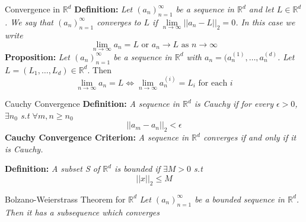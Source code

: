 \documentclass{article}
\begin{document}
\begin{multicols*}{3}
\begin{blackbox}{Convergence in $\mathbb{R}^d$}
\textbf{Definition:}\textit{ Let $(a_n)_{n=1}^\infty$ be a sequence in $\mathbb{R}^d$ and let $L \in \mathbb{R}^d$. We say that $(a_n)_{n=1}^\infty$ converges to $L$ if $\lim\limits_{n\rightarrow\infty} ||a_n - L||_2 = 0$. In this case we write}\\[-3ex]
\[\lim_{n\rightarrow \infty} a_n = L \text{ or } a_n \rightarrow L \text{ as } n \rightarrow \infty\]
\textbf{Proposition:}\textit{ Let $(a_n)_{n=1}^\infty$ be a sequence in $\mathbb{R}^d$ with $a_n = (a_n^{(1)}, \ldots, a_n^{(d)}$. Let $L = (L_1, \ldots, L_d) \in \mathbb{R}^d$}. Then\\[-2ex]
\[\lim_{n\rightarrow\infty} a_n = L \iff \lim_{n\rightarrow\infty} a_n^{(i)} = L_i \text{ for each $i$}\]
\begin{redbox}{Cauchy Convergence}
    \textbf{Definition:}\textit{ A sequence in $\mathbb{R}^d$ is \emph{Cauchy} if for every $\epsilon > 0$, $\exists n_0$ s.t $\forall m,n \geq n_0$}
    \[||a_m-a_n||_2 < \epsilon\]
    \textbf{Cauchy Convergence Criterion:} \textit{A sequence in $\mathbb{R}^d$ converges if and only if it is Cauchy.}
    \end{redbox}
    \textbf{Definition:}\textit{ A subset S of $\mathbb{R}^d$ is bounded if $\exists M>0$ s.t}\\[-2ex]
    \[||x||_2 \leq M\]
    \begin{brownbox}{Bolzano-Weierstrass Theorem for $\mathbb{R}^d$}
    \textit{Let $(a_n)_{n=1}^\infty$ be a bounded sequence in $\mathbb{R}^d$. Then it has a subsequence which converges}
    \end{brownbox}\\[-3ex]
\end{blackbox}
\end{multicols*}
\end{document}
